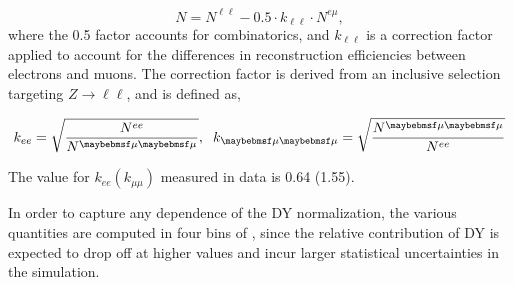\begin{equation}
  N = N^{\ell\ell} - 0.5\cdot k_{\ell\ell} \cdot N^{e\mu},
\end{equation}
where the 0.5 factor accounts for combinatorics, and $k_{\ell\ell}$ is a correction factor applied to account for the differences in reconstruction efficiencies between electrons and muons. The correction factor is derived from an inclusive selection targeting $Z\rightarrow\ell\ell$, and is defined as,

\begin{equation}
  k_{ee} = \sqrt{\frac{N^{ee}}{N^{\mu\mu}}}, \hspace{0.2cm} k_{\mu\mu} = \sqrt{\frac{N^{\mu\mu}}{N^{ee}}}
\end{equation}

The value for $k_{ee} (k_{\mu\mu})$ measured in data is 0.64 (1.55). 

In order to capture any \ptmiss dependence of the DY normalization, the various \Rinout quantities are computed in four bins of \ptmiss, since the relative contribution of DY is expected to drop off at higher \ptmiss values and incur larger statistical uncertainties in the simulation.


\begin{table}[!htbp]
  \caption{DY yields and \Rinout values in the $ee$ channel, for 0 b-tag selection}
\end{table}


